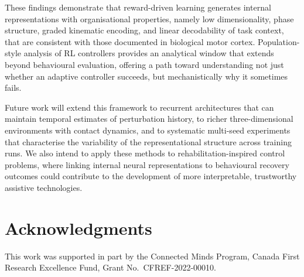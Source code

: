 \documentclass{article}
\begin{document}
These findings demonstrate that reward-driven learning generates internal
representations with organisational properties, namely low dimensionality,
phase structure, graded kinematic encoding, and linear decodability of task
context, that are consistent with those documented in biological motor cortex.
Population-style analysis of RL controllers provides an analytical window
that extends beyond behavioural evaluation, offering a path toward
understanding not just whether an adaptive controller succeeds, but
mechanistically why it sometimes fails.

Future work will extend this framework to recurrent architectures that
can maintain temporal estimates of perturbation history, to richer
three-dimensional environments with contact dynamics, and to systematic
multi-seed experiments that characterise the variability of the
representational structure across training runs.
We also intend to apply these methods to rehabilitation-inspired control
problems, where linking internal neural representations to behavioural
recovery outcomes could contribute to the development of more
interpretable, trustworthy assistive technologies.

\section*{Acknowledgments}

This work was supported in part by the Connected Minds Program,
Canada First Research Excellence Fund,
Grant No.~CFREF-2022-00010.



\end{document}
